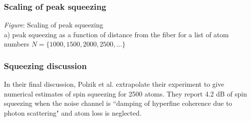 \documentclass[preprint,aps,pra,onecolumn]{revtex4-1} %
\newcommand{\comment}[1]{{\color{Maroon} #1}}
\begin{document}
\subsubsection{Scaling of peak squeezing}
\comment{
\emph{Figure}:  Scaling of peak squeezing \\
a) peak squeezing as a function of distance from the fiber for a list of atom numbers $N= \{1000,1500,2000,2500,...\}$
}

\subsubsection{Squeezing discussion}	
In their final discussion, Polzik et al. \cite{beguin_generation_2014} extrapolate their experiment to give numerical estimates of spin squeezing for 2500 atoms.  They report 4.2 dB of spin squeezing when the noise channel is ``damping of hyperfine coherence due to photon scattering" and atom loss is neglected. 
\end{document}
